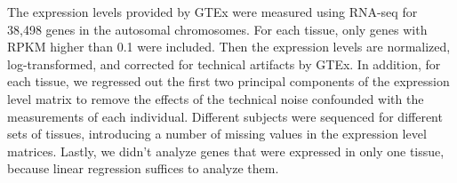 \documentclass[12pt]{extarticle}
\theoremstyle{theorem}
\begin{document}
\noindent The expression levels provided by GTEx were measured using RNA-seq for 38,498 genes in the autosomal chromosomes. For each tissue, only genes with RPKM higher than 0.1 were included. Then the expression levels are normalized, log-transformed, and corrected for technical artifacts by GTEx. In addition, for each tissue, we regressed out the first two principal components of the expression level matrix to remove the effects of the technical noise confounded with the measurements of each individual. Different subjects were sequenced for different sets of tissues, introducing a number of missing values in the expression level matrices. Lastly, we didn't analyze genes that were expressed in only one tissue, because linear regression suffices to analyze them. 




\end{document}
